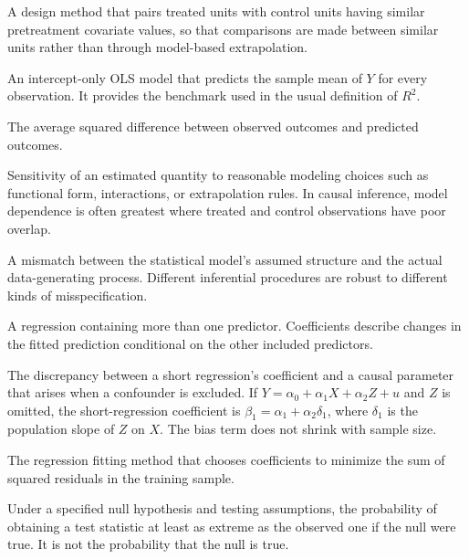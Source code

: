 \documentclass[11pt]{report}
\begin{document}
\begin{description}[style=nextline,leftmargin=0pt,labelindent=0pt,font=\bfseries]
\item[Matching] A design method that pairs treated units with control units having similar pretreatment covariate values, so that comparisons are made between similar units rather than through model-based extrapolation.

\item[Mean-only model] An intercept-only OLS model that predicts the sample mean of \(Y\) for every observation. It provides the benchmark used in the usual definition of \(R^2\).

\item[Mean squared error (MSE)] The average squared difference between observed outcomes and predicted outcomes.

\item[Model dependence] Sensitivity of an estimated quantity to reasonable modeling choices such as functional form, interactions, or extrapolation rules. In causal inference, model dependence is often greatest where treated and control observations have poor overlap.

\item[Model misspecification] A mismatch between the statistical model's assumed structure and the actual data-generating process. Different inferential procedures are robust to different kinds of misspecification.

\item[Multiple regression] A regression containing more than one predictor. Coefficients describe changes in the fitted prediction conditional on the other included predictors.

\item[Omitted variable bias] The discrepancy between a short regression's coefficient and a causal parameter that arises when a confounder is excluded. If \(Y=\alpha_0+\alpha_1X+\alpha_2Z+u\) and \(Z\) is omitted, the short-regression coefficient is \(\beta_1=\alpha_1+\alpha_2\delta_1\), where \(\delta_1\) is the population slope of \(Z\) on \(X\). The bias term does not shrink with sample size.

\item[Ordinary least squares (OLS)] The regression fitting method that chooses coefficients to minimize the sum of squared residuals in the training sample.

\item[p-value] Under a specified null hypothesis and testing assumptions, the probability of obtaining a test statistic at least as extreme as the observed one if the null were true. It is not the probability that the null is true.


\end{description}
\end{document}
